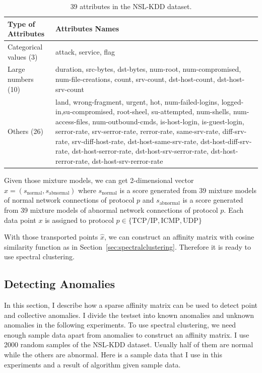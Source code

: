 \begin{table}[h]
\begin{center}
\begin{tabular}{| l | p{10cm} |}
\hline
Type of Attributes & Attributes Names \\
\hline
Categorical values (3) & attack, service, flag \\
\hline
Large numbers (10) & duration, src-bytes, dst-bytes, num-root, num-compromised, num-file-creations, count, srv-count, dst-host-count, dst-host-srv-count \\
\hline
Others (26) & land, wrong-fragment, urgent, hot, num-failed-logins, logged-in,su-compromised, root-sheel, su-attempted, num-shells, num-access-files, num-outbound-cmds, is-host-login, is-guest-login, serror-rate, srv-serror-rate, rerror-rate, same-srv-rate, diff-srv-rate, srv-diff-host-rate, dst-host-same-srv-rate, dst-host-diff-srv-rate, dst-host-serror-rate, dst-host-srv-serror-rate, dst-host-rerror-rate, dst-host-srv-rerror-rate \\
\hline
\end{tabular}
\end{center}
\caption{39 attributes in the NSL-KDD dataset.} %
\label{fig:preprocessing}
\end{table}

Given those mixture models, we can get 2-dimensional vector $\hat{x} = (s_{\text{normal}}, s_{\text{abnormal}})$ 
where $s_{\text{normal}}$ is a score generated from 39 mixture models of normal network connections of protocol $p$ 
and $s_{\text{abnormal}}$ is a score generated from 39 mixture models of abnormal network connections of protocol $p$. 
Each data point $x$ is assigned to protocol $p \in \{\text{TCP/IP}, \text{ICMP}, \text{UDP}\}$ 

With those transported points $\hat{x}$, we can construct an affinity matrix with cosine similarity function as in Section~\ref{sec:spectralclustering}. 
Therefore it is ready to use spectral clustering. 

\subsection{Detecting Anomalies}
\label{subsec:detectinganomalies}
In this section, I describe how a sparse affinity matrix can be used to detect point and collective anomalies. 
I divide the testset into known anomalies and unknown anomalies in the following experiments. 
To use spectral clustering, we need enough sample data apart from anomalies to construct an affinity matrix. 
I use 2000 random samples of the NSL-KDD dataset. 
Usually half of them are normal while the others are abnormal. 
Here is a sample data that I use in this experiments and a result of algorithm given sample data. 

